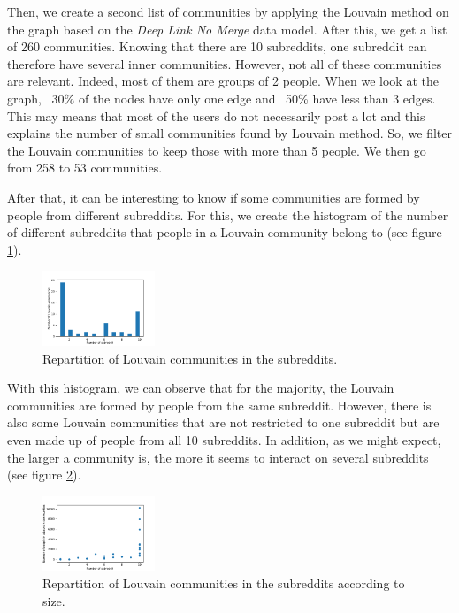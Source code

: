 Then, we create a second list of communities by applying the Louvain method on the graph based on the \textit{Deep Link No Merge} data model.
After this, we get a list of 260 communities. Knowing that there are 10 subreddits, one subreddit can therefore have several inner communities. However, not all of these communities are relevant. Indeed, most of them are groups of 2 people. When we look at the graph, ~30\% of the nodes have only one edge and ~50\% have less than 3 edges. This may means that most of the users do not necessarily post a lot and this explains the number of small communities found by Louvain method. So, we filter the Louvain communities to keep those with more than 5 people. We then go from 258 to 53 communities.

After that, it can be interesting to know if some communities are formed by people from different subreddits. For this, we create the histogram of the number of different subreddits that people in a Louvain community belong to (see figure \ref{fig:louvainrepartition}).

\begin{figure}[H]
    \centering
    \includegraphics[width=0.3\textwidth]{figures/inner_communities_repartition.pdf}
    \caption{Repartition of Louvain communities in the subreddits.}
    \label{fig:louvainrepartition}
\end{figure}

With this histogram, we can observe that for the majority, the Louvain communities are formed by people from the same subreddit. However, there is also some Louvain communities that are not restricted to one subreddit but are even made up of people from all 10 subreddits. In addition, as we might expect, the larger a community is, the more it seems to interact on several subreddits (see figure \ref{fig:louvainsizerepartition}).

\begin{figure}[H]
    \centering
    \includegraphics[width=0.3\textwidth]{figures/communities_repartition_by_size.pdf}
    \caption{Repartition of Louvain communities in the subreddits according to size.}
    \label{fig:louvainsizerepartition}
\end{figure}

